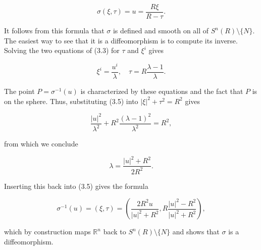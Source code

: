 
\begin{equation}
\sigma(\xi, \tau) = u = \frac{R\xi}{R - \tau}. \tag{3.4}
\end{equation}

It follows from this formula that $\sigma$ is defined and smooth on all of $S^n(R) \setminus \{N\}$.
The easiest way to see that it is a diffeomorphism is to compute its inverse. Solving
the two equations of (3.3) for $\tau$ and $\xi^i$ gives

\begin{equation}
\xi^i = \frac{u^i}{\lambda}, \quad \tau = R\frac{\lambda - 1}{\lambda}. \tag{3.5}
\end{equation}

The point $P = \sigma^{-1}(u)$ is characterized by these equations and the fact that $P$ is on
the sphere. Thus, substituting (3.5) into $|\xi|^2 + \tau^2 = R^2$ gives

\[\frac{|u|^2}{\lambda^2} + R^2\frac{(\lambda - 1)^2}{\lambda^2} = R^2,\]

from which we conclude

\[\lambda = \frac{|u|^2 + R^2}{2R^2}.\]

Inserting this back into (3.5) gives the formula

\begin{equation}
\sigma^{-1}(u) = (\xi, \tau) = \left(\frac{2R^2u}{|u|^2 + R^2}, R\frac{|u|^2 - R^2}{|u|^2 + R^2}\right), \tag{3.6}
\end{equation}

which by construction maps $\mathbb{R}^n$ back to $S^n(R) \setminus \{N\}$ and shows that $\sigma$ is a diffeomorphism.

